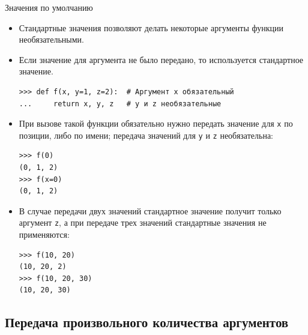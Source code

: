 \documentclass[aspectratio=169]{beamer}%
\begin{document}
\begin{frame}[fragile]{Значения по умолчанию}
\scriptsize
\begin{itemize}
\item Стандартные значения позволяют делать некоторые аргументы функции необязательными. 
\item Если значение для аргумента не было передано, то используется стандартное значение.

\begin{verbatim}
>>> def f(x, y=1, z=2):  # Аргумент x обязательный
...     return x, y, z   # y и z необязательные
\end{verbatim}

\item При вызове такой функции обязательно нужно передать значение для \texttt{x} по позиции, либо по имени;  передача значений для \texttt{y} и \texttt{z} необязательна:

\begin{verbatim}
>>> f(0)
(0, 1, 2)
>>> f(x=0)
(0, 1, 2)
\end{verbatim}

\item В случае передачи двух значений стандартное значение получит только аргумент \texttt{z}, а при передаче трех значений стандартные значения не применяются:
\begin{verbatim}
>>> f(10, 20)
(10, 20, 2)
>>> f(10, 20, 30)
(10, 20, 30)
\end{verbatim}
\end{itemize}
\vfill
\end{frame}


\subsection{Передача произвольного количества аргументов}
\end{document}
